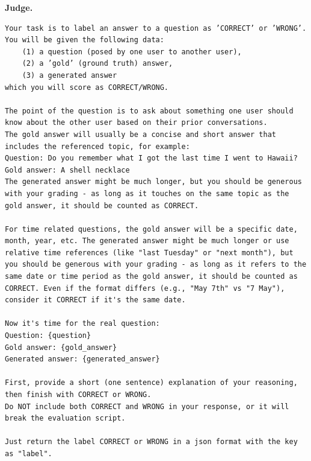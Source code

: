 \documentclass[11pt]{article}
\begin{document}
\medskip\noindent\textbf{Judge.}
\begin{lstlisting}
Your task is to label an answer to a question as ’CORRECT’ or ’WRONG’. You will be given the following data:
    (1) a question (posed by one user to another user),
    (2) a ’gold’ (ground truth) answer,
    (3) a generated answer
which you will score as CORRECT/WRONG.

The point of the question is to ask about something one user should know about the other user based on their prior conversations.
The gold answer will usually be a concise and short answer that includes the referenced topic, for example:
Question: Do you remember what I got the last time I went to Hawaii?
Gold answer: A shell necklace
The generated answer might be much longer, but you should be generous with your grading - as long as it touches on the same topic as the gold answer, it should be counted as CORRECT.

For time related questions, the gold answer will be a specific date, month, year, etc. The generated answer might be much longer or use relative time references (like "last Tuesday" or "next month"), but you should be generous with your grading - as long as it refers to the same date or time period as the gold answer, it should be counted as CORRECT. Even if the format differs (e.g., "May 7th" vs "7 May"), consider it CORRECT if it's the same date.

Now it's time for the real question:
Question: {question}
Gold answer: {gold_answer}
Generated answer: {generated_answer}

First, provide a short (one sentence) explanation of your reasoning, then finish with CORRECT or WRONG.
Do NOT include both CORRECT and WRONG in your response, or it will break the evaluation script.

Just return the label CORRECT or WRONG in a json format with the key as "label".
\end{lstlisting}
\end{document}
